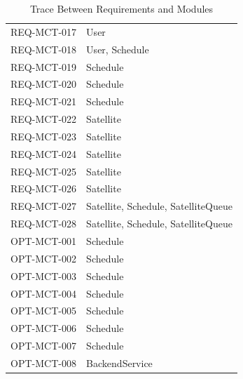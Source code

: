 \documentclass[12pt, titlepage]{article}
\begin{document}
\begin{table}[H]
\begin{tabular}{p{} p{}}
REQ-MCT-017 & User \\ 

REQ-MCT-018 & User, Schedule \\ 

REQ-MCT-019 & Schedule \\ 

REQ-MCT-020 & Schedule \\ 

REQ-MCT-021 & Schedule \\ 

REQ-MCT-022 & Satellite \\ 

REQ-MCT-023 & Satellite \\ 

REQ-MCT-024 & Satellite \\ 

REQ-MCT-025 & Satellite \\ 

REQ-MCT-026 & Satellite \\ 

REQ-MCT-027 & Satellite, Schedule, SatelliteQueue \\ 

REQ-MCT-028 & Satellite, Schedule, SatelliteQueue \\ 

OPT-MCT-001 & Schedule \\ 

OPT-MCT-002 & Schedule \\ 

OPT-MCT-003 & Schedule \\ 

OPT-MCT-004 & Schedule \\ 

OPT-MCT-005 & Schedule \\ 

OPT-MCT-006 & Schedule \\ 

OPT-MCT-007 & Schedule \\ 

OPT-MCT-008 & BackendService \\

\bottomrule
\end{tabular}
\caption{Trace Between Requirements and Modules}
\label{TblRT}
\end{table}
\end{document}
